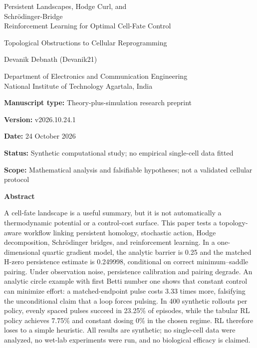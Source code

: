 \documentclass[11pt]{article}
\newcommand{\1}{\mathbf{1}}
\begin{document}
\begin{titlepage}
\thispagestyle{empty}
\vspace*{0.24in}
\noindent{\color{Accent}\rule{\linewidth}{2pt}}\par\vspace{0.10in}
{\fontsize{19}{23}\selectfont\bfseries\color{Ink}\parbox{\dimexpr\linewidth-22pt\relax}{Persistent Landscapes, Hodge Curl, and\\[0.10in] Schrödinger-Bridge\\[0.10in] Reinforcement Learning for Optimal Cell-Fate Control}\par}
\vspace{0.10in}
{\Large\color{Accent}Topological Obstructions to Cellular Reprogramming\par}
\vspace{0.18in}
{\large Devanik Debnath (Devanik21)\par}
\vspace{0.05in}
{\normalsize Department of Electronics and Communication Engineering\\National Institute of Technology Agartala, India\par}
\vspace{0.12in}
{\small
\noindent\textbf{Manuscript type:} Theory-plus-simulation research preprint\par
\noindent\textbf{Version:} v2026.10.24.1\par
\noindent\textbf{Date:} 24 October 2026\par
\noindent\textbf{Status:} Synthetic computational study; no empirical single-cell data fitted\par
\noindent\textbf{Scope:} Mathematical analysis and falsifiable hypotheses; not a validated cellular protocol\par
}
\vspace{0.16in}
\noindent{\color{Accent}\rule{\dimexpr\linewidth-16pt\relax}{0.8pt}}\par\vspace{0.12in}
\textbf{Abstract}\par\vspace{0.04in}\begingroup\fontsize{9.3}{11.0}\selectfont
A cell-fate landscape is a useful summary, but it is not automatically a thermodynamic potential or a control-cost surface. This paper tests a topology-aware workflow linking persistent homology, stochastic action, Hodge decomposition, Schrödinger bridges, and reinforcement learning. In a one-dimensional quartic gradient model, the analytic barrier is 0.25 and the matched H-zero persistence estimate is 0.249998, conditional on correct minimum--saddle pairing. Under observation noise, persistence calibration and pairing degrade. An analytic circle example with first Betti number one shows that constant control can minimize effort: a matched-endpoint pulse costs 3.33 times more, falsifying the unconditional claim that a loop forces pulsing. In 400 synthetic rollouts per policy, evenly spaced pulses succeed in 23.25\% of episodes, while the tabular RL policy achieves 7.75\% and constant dosing 0\% in the chosen regime. RL therefore loses to a simple heuristic. All results are synthetic; no single-cell data were analyzed, no wet-lab experiments were run, and no biological efficacy is claimed.

\end{titlepage}
\end{document}
